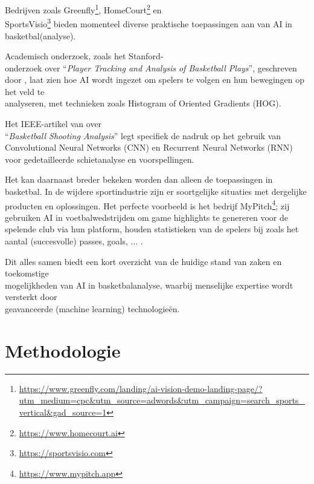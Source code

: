Bedrijven zoals Greenfly\footnote{\url{https://www.greenfly.com/landing/ai-vision-demo-landing-page/?utm_medium=cpc&utm_source=adwords&utm_campaign=search_sports_vertical&gad_source=1}}, HomeCourt\footnote{\url{https://www.homecourt.ai}} en \\SportsVisio\footnote{\url{https://sportsvisio.com}} bieden momenteel diverse praktische toepassingen aan van AI in basketbal(analyse).

Academisch onderzoek, zoals het Stanford-\\onderzoek over ``\emph{Player Tracking and Analysis of Basketball Plays}'', geschreven door \textcite{R1}, laat zien hoe AI wordt ingezet om spelers te volgen en hun bewegingen op het veld te \\analyseren, met technieken zoals Histogram of Oriented Gradients (HOG).

Het IEEE-artikel van \textcite{R7} over \\``\emph{Basketball Shooting Analysis}'' legt specifiek de nadruk op het gebruik van Convolutional Neural Networks (CNN) en Recurrent Neural Networks (RNN) voor gedetailleerde schietanalyse en voorspellingen.

Het kan daarnaast breder bekeken worden dan alleen de toepassingen in basketbal. In de wijdere sportindustrie zijn er soortgelijke situaties met dergelijke producten en oplossingen. Het perfecte voorbeeld is het bedrijf MyPitch\footnote{\url{https://www.mypitch.app}}; zij gebruiken AI in voetbalwedstrijden om game highlights te genereren voor de spelende club via hun platform, houden statistieken van de spelers bij zoals het aantal (succesvolle) passes, goals, $\ldots$ .

Dit alles samen biedt een kort overzicht van de huidige stand van zaken en toekomstige \\mogelijkheden van AI in basketbalanalyse, waarbij menselijke expertise wordt versterkt door \\geavanceerde (machine learning) technologieën.

\section{Methodologie}%
\label{sec:methodologie}


